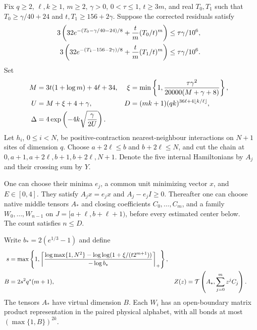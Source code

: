 \begin{theorem}
    \label{thm:uniform_physical_soft_improving_family}
    \leanok
    Fix $q\ge2$, $\ell,k\ge1$, $m\ge2$, $\gamma>0$, $0<\tau\le1$,
    $t\ge3m$, and real $T_0,T_1$ such that
    $T_0\ge\gamma/40+24$ and $t,T_1\ge156+2\gamma$.
    Suppose the corrected residuals satisfy
    \begin{align}
        3\left(32e^{-(T_0-\gamma/40-24)/8}
        +\frac{t}{m}(T_0/t)^m\right) & \le\tau\gamma/10^6,\notag \\
        3\left(32e^{-(T_1-156-2\gamma)/8}
        +\frac{t}{m}(T_1/t)^m\right) & \le\tau\gamma/10^6.
        \label{eq:uniform_soft_residual_budgets}
    \end{align}
    Set
    \begin{align}
        M      & =3t(1+\log m)+4\ell+34,                                             &
        \xi    & =\min\left\{1,\frac{\tau\gamma^2}{20000(M+\gamma+8)}\right\},\notag   \\
        U      & =M+\xi+4+\gamma,                                                    &
        D      & =(mk+1)(qk)^{36\ell+4\lfloor k/\ell\rfloor},\notag                    \\
        \Delta & =4\exp\left(-4k\sqrt{\frac{\gamma}{2U}}\right).
        \label{eq:uniform_soft_family_budgets}
    \end{align}
    Let $h_i$, $0\le i<N$, be positive-contraction nearest-neighbour
    interactions on $N+1$ sites of dimension $q$. Choose
    $a+2\ell\le b$ and $b+2\ell\le N$, and cut the chain at
    $0,a+1,a+2\ell,b+1,b+2\ell,N+1$. Denote the five internal
    Hamiltonians by $A_j$ and their crossing sum by $Y$.

    One can choose their minima $e_j$, a common unit minimizing vector
    $x$, and $E\in[0,4]$. They satisfy $A_jx=e_jx$ and $A_j-e_jI\ge0$.
    Thereafter one can choose native middle tensors $A_*$ and closing
    coefficients $C_0,\ldots,C_m$, and a family $W_0,\ldots,W_{n-1}$
    on $J=[a+\ell,b+\ell+1)$, before every estimated center below.
    The count satisfies $n\le D$.

    Write $b_*=2(e^{1/3}-1)$ and define
    \begin{align}
        s    & =\max\left\{1,
        \left\lceil
        \frac{\log\max\{1,N^2\}-\log\log(1+\xi/(t2^{m+1}))}
        {-\log b_*}
        \right\rceil_+\right\},\notag                               \\
        B    & =2s^2q^s(m+1),                                     &
        Z(z) & =\mathcal T\left(A_*,\sum_{j=0}^{m}z^j C_j\right).
        \label{eq:uniform_soft_native_family}
    \end{align}
    The tensors $A_*$ have virtual dimension $B$. Each $W_i$ has an
    open-boundary matrix product representation in the paired physical
    alphabet, with all bonds at most $(\max\{1,B\})^{2k}$.


\end{theorem}
